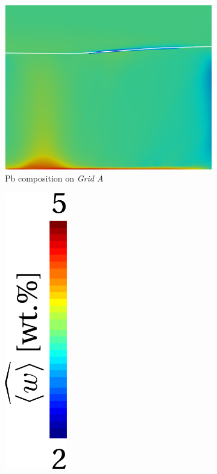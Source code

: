 \begin{figure}[H]
\centering
  \begin{subfigure}[t]{0.4\textwidth}
    \centering
  \includegraphics[width=\textwidth]{Chapter5/Graphics/2d/processed/1700s_compo.png}
  \caption{Pb composition on \emph{Grid A}}
    \label{fig:1700s_compo}
  \end{subfigure}
  \begin{subfigure}[t]{0.15\textwidth}
    \centering
  \includegraphics[width=0.3\textwidth]{Chapter5/Graphics/2d/colorbar_w.pdf}

\end{subfigure}
\end{figure}

